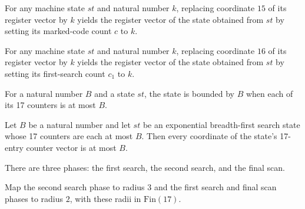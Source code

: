 \begin{lemma}
\label{Complexity.LogProg.ExpBFS.St.upd_c}
\leanok
{}
For any machine state $st$ and natural number $k$, replacing coordinate $15$ of its
register vector by $k$ yields the register vector of the state obtained from $st$ by
setting its marked-code count $c$ to $k$.
\end{lemma}

\begin{lemma}
\label{Complexity.LogProg.ExpBFS.St.upd_c1}
\leanok
{}
For any machine state $st$ and natural number $k$, replacing coordinate $16$ of its
register vector by $k$ yields the register vector of the state obtained from $st$ by
setting its first-search count $c_1$ to $k$.
\end{lemma}

\begin{definition}
\label{Complexity.LogProg.ExpBFS.St.Bd}
\leanok
{}
For a natural number $B$ and a state $st$, the state is bounded by $B$ when each of its
17 counters is at most $B$.
\end{definition}

\begin{lemma}
\label{Complexity.LogProg.ExpBFS.St.Bd.toV}
\leanok
{}
Let $B$ be a natural number and let $st$ be an exponential breadth-first search state
whose 17 counters are each at most $B$. Then every coordinate of the state’s 17-entry
counter vector is at most $B$.
\end{lemma}

\begin{definition}
\label{Complexity.LogProg.ExpBFS.Ph3}
\leanok
There are three phases: the first search, the second search, and the final scan.
\end{definition}

\begin{definition}
\label{Complexity.LogProg.ExpBFS.rad}
\leanok
{}
Map the second search phase to radius $3$ and the first search and final scan phases to
radius $2$, with these radii in $\mathrm{Fin}(17)$.
\end{definition}


